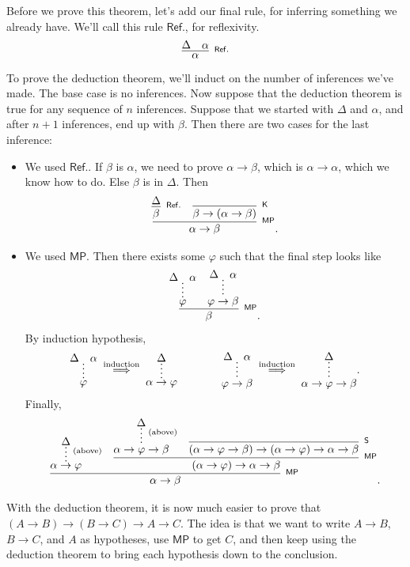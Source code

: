 \documentclass[11pt,paper=letter]{scrartcl}
\newcommand{\sf}{\mathsf}
\newcommand{\vc}[1]{\vcenter{\hbox{#1}}}
\begin{document}
Before we prove this theorem, let's add our final rule, for inferring something we already have. We'll call this rule $\sf{Ref.}$, for reflexivity.
\[
\infer[^\sf{Ref.}]
{\alpha}
{\Delta & \alpha}
\]
To prove the deduction theorem, we'll induct on the number of inferences we've made. The base case is no inferences. Now suppose that the deduction theorem is true for any sequence of $n$ inferences. Suppose that we started with $\Delta$ and $\alpha$, and after $n+1$ inferences, end up with $\beta$. Then there are two cases for the last inference:
\begin{itemize}
\item We used $\sf{Ref.}$. If $\beta$ is $\alpha$, we need to prove $\alpha \to \beta$, which is $\alpha \to \alpha$, which we know how to do. Else $\beta$ is in $\Delta$. Then
\begin{align*}
\infer[^\sf{MP}]
{\alpha \to \beta}
{
\infer[^\sf{Ref.}]
{\beta}
{\Delta}
&
\infer[^\sf{K}]
{\beta \to (\alpha \to \beta)}
{}
}.
\end{align*}
\item We used $\sf{MP}$. Then there exists some $\varphi$ such that the final step looks like
\begin{align*}
\infer[^\sf{MP}]
{\beta}
{
\infer*
{\varphi}
{\Delta & \alpha}
&
\infer*
{\varphi \to \beta}
{\Delta & \alpha}
}.
\end{align*}
By induction hypothesis,
\begin{align*}
\vc{\infer*
{\varphi}
{\Delta & \alpha}}
\;\overset{\text{induction}}{\implies}\;
\vc{\infer*
{\alpha \to \varphi}
{\Delta}}
\qquad\qquad
\vc{\infer*
{\varphi \to \beta}
{\Delta & \alpha}}
\;\overset{\text{induction}}{\implies}\;
\vc{\infer*
{\alpha \to \varphi \to \beta}
{\Delta}}.
\end{align*}
Finally,
\begin{align*}
\infer[^\sf{MP}]
{\alpha \to \beta}
{
\infer*[^\text{(above)}]{\alpha \to \varphi}{\Delta}
&
\infer[^\sf{MP}]{(\alpha \to \varphi) \to \alpha \to \beta}{
\infer*[^\text{(above)}]{\alpha \to \varphi \to \beta}{\Delta}
&
\infer[^\sf{S}]{(\alpha \to \varphi \to \beta) \to (\alpha \to \varphi) \to \alpha \to \beta}{}
}
}.
\end{align*}
\end{itemize}
With the deduction theorem, it is now much easier to prove that $(A \to B) \to (B \to C) \to A \to C$. The idea is that we want to write $A \to B$, $B \to C$, and $A$ as hypotheses, use $\sf{MP}$ to get $C$, and then keep using the deduction theorem to bring each hypothesis down to the conclusion.
\end{document}
